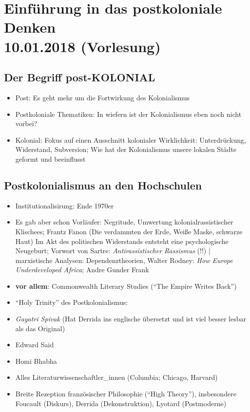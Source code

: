 \documentclass[emulatestandardclasses]{scrartcl}
\begin{document}
\section{Einführung in das postkoloniale Denken\\10.01.2018 (Vorlesung)}

\subsection{Der Begriff post-KOLONIAL}

\begin{itemize}
  \item Post: Es geht mehr um die Fortwirkung des Kolonialismus
  \item Postkoloniale Thematiken: In wiefern ist der Kolonialismus eben noch nicht vorbei?
  \item Kolonial: Fokus auf einen Ausschnitt kolonialer Wirklichkeit: Unterdrückung, Widerstand, Subversion; Wie hat der Kolonialismus unsere lokalen Städte geformt und beeinflusst
\end{itemize}

\subsection{Postkolonialismus an den Hochschulen}

\begin{itemize}
  \item Institutionalisirung: Ende 1970er
  \item Es gab aber schon Vorläufer: Negritude, Umwertung kolonialrassistischer Klischees; Frantz Fanon (Die verdammten der Erde, Weiße Maske, schwarze Haut) Im Akt des politischen Widerstands entsteht eine psychologische Neugeburt; Vorwort von Sartre: \emph{Antirassistischer Rassismus} (!!) | marxistische Analysen: Dependenztheorien, Walter Rodney: \emph{How Europe Underdeveloped Africa}; Andre Gunder Frank 
  \item \textbf{vor allem}: Commonwealth Literary Studies ("`The Empire Writes Back"')
  \item "`Holy Trinity"' des Postkolonialismus:
  \item \emph{Gayatri Spivak} (Hat Derrida ins englische übersetzt und ist viel besser lesbar als das Original) 
  \item Edward Said
  \item Homi Bhabha
  \item Alles Literaturwissenschaftler\_innen (Columbia; Chicago, Harvard)
  \item Breite Rezeption französischer Philosophie ("`High Theory"'), insbesondere Foucault (Diskurs), Derrida (Dekonstruktion), Lyotard (Postmoderne)
\end{itemize}
\end{document}
